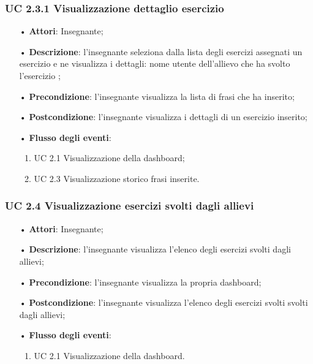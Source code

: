 \subsubsection{UC 2.3.1 Visualizzazione dettaglio esercizio}
\begin{itemize}
	\item[•] \textbf{Attori}: Insegnante;
	\item[•] \textbf{Descrizione}: l’insegnante seleziona dalla lista degli esercizi assegnati un esercizio e ne visualizza i dettagli: nome utente dell'allievo che ha svolto l'esercizio ;
	\item[•] \textbf{Precondizione}: l'insegnante visualizza la lista di frasi che ha inserito;
	\item[•] \textbf{Postcondizione}: l’insegnante visualizza i dettagli di un esercizio inserito;
	\item[•] \textbf{Flusso degli eventi}: 
	\begin{enumerate}
		\item UC 2.1 Visualizzazione della dashboard;
		\item UC 2.3 Visualizzazione storico frasi inserite.
	\end{enumerate}
\end{itemize}


\subsubsection{UC 2.4 Visualizzazione esercizi svolti dagli allievi}
\begin{itemize}
	\item[•] \textbf{Attori}: Insegnante;
	\item[•] \textbf{Descrizione}:  l’insegnante visualizza l’elenco degli esercizi svolti dagli allievi;
	\item[•] \textbf{Precondizione}: l’insegnante visualizza la propria dashboard;
	\item[•] \textbf{Postcondizione}: l’insegnante visualizza l'elenco degli esercizi svolti svolti dagli allievi;
	\item[•] \textbf{Flusso degli eventi}:
	\begin{enumerate}
		\item UC 2.1 Visualizzazione della dashboard.
	\end{enumerate}
\end{itemize}


